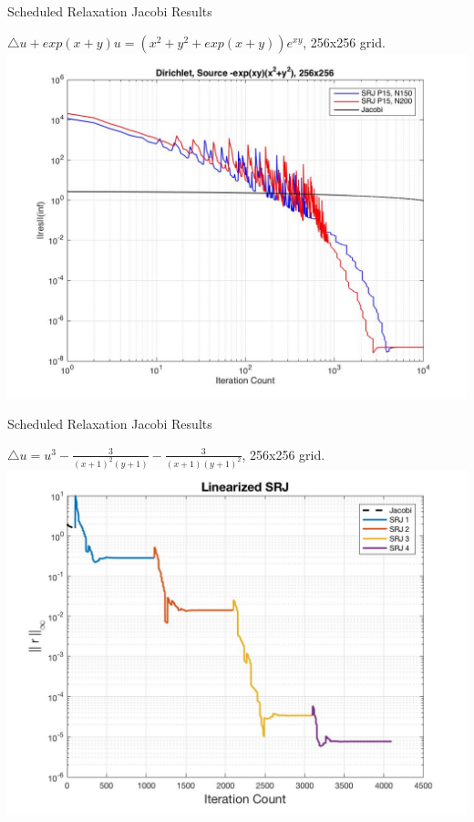 \documentclass{beamer}
\begin{document}
\begin{frame}{Scheduled Relaxation Jacobi Results}
    \begin{center}
         $\triangle u+exp(x+y)u=(x^2+y^2+exp(x+y))e^{xy}$, 256x256 grid.
        \includegraphics[scale=0.2]{exp(xy).jpg}
    \end{center}
\end{frame}

\begin{frame}{Scheduled Relaxation Jacobi Results}
    \begin{center}
        $\triangle u = u^3-\frac{3}{(x+1)^2(y+1)}-\frac{3}{(x+1)(y+1)^2}$, 256x256 grid.
        \includegraphics[scale=0.2]{SRJ.jpg}
    \end{center}
\end{frame}
\end{document}
